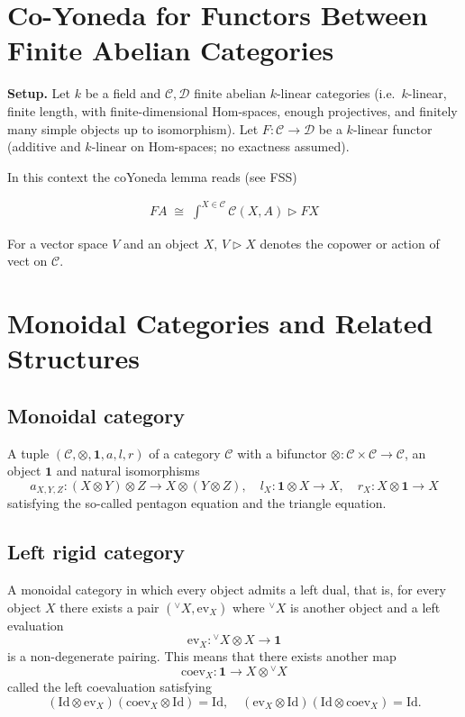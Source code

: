 \documentclass[11pt]{article}
\newcommand{\C}{\mathcal{C}}
\theoremstyle{definition}
\begin{document}
\section{Co-Yoneda for Functors Between Finite Abelian Categories}

\textbf{Setup.} Let $k$ be a field and $\mathcal{C}, \mathcal{D}$ finite abelian
$k$-linear categories (i.e.\ $k$-linear, finite length, with finite-dimensional
Hom-spaces, enough projectives, and finitely many simple objects up to isomorphism).
Let $F : \mathcal{C} \to \mathcal{D}$ be a $k$-linear functor (additive and
$k$-linear on Hom-spaces; no exactness assumed).


In this context the coYoneda lemma reads (see FSS)



\begin{align}
\boxed{
FA \;\cong\; \int^{X \in \mathcal{C}} \mathcal{C}(X,A) \triangleright FX
}
\end{align}


For a vector space $V$ and an object $X$, $V \triangleright X$ denotes the copower or action of vect on $\C$.



\section{Monoidal Categories and Related Structures}

\subsection{Monoidal category}
A tuple \( (\mathcal{C}, \otimes, \mathbf{1}, a, l,r) \) of a category \( \mathcal{C} \) with a bifunctor \( \otimes: \mathcal{C} \times \mathcal{C} \to \mathcal{C} \), an object \(\mathbf{1} \) and natural isomorphisms
\[ a_{X,Y,Z}: (X \otimes Y) \otimes Z \to X \otimes(Y \otimes Z), \quad l_X: \mathbf{1} \otimes X \to X, \quad r_X: X \otimes \mathbf{1} \to X 
\]
satisfying the so-called pentagon equation and the triangle equation.

\subsection{Left rigid category}
A monoidal category in which every object admits a left dual, that is, for every object \( X \) there exists a pair \( (^\vee X, \mathrm{ev}_X)\) where \( {}^\vee X\) is another object and a left evaluation
\[ \mathrm{ev}_X :{}^\vee X \otimes X \to  \mathbf{1} \]
is a non-degenerate pairing. This means that there exists another map
\[ \mathrm{coev}_X : \mathbf{1}  \to X \otimes {}^\vee X \]
called the left coevaluation satisfying
\[
(\mathrm{Id} \otimes  \mathrm{ev}_X)(\mathrm{coev}_X \otimes \mathrm{Id} ) = \mathrm{Id}, \quad (\mathrm{ev}_X \otimes \mathrm{Id}  )(\mathrm{Id} \otimes \mathrm{coev}_X  ) = \mathrm{Id}.
\]
\end{document}
